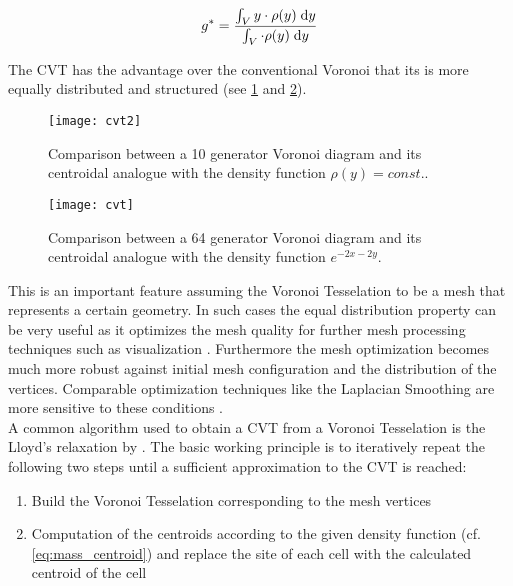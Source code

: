 \begin{equation} 
\label{eq:mass_centroid}
g^* = {{\int_V y \cdot \rho (y) \; \mathrm{d} y} \over {\int_V \cdot \rho (y) \; \mathrm{d} y}}
\end{equation}

The \ac{CVT} has the advantage over the conventional Voronoi that its is more equally distributed and structured (see \cref{fig:cvt2} and \cref{fig:cvt}).

\begin{figure}[H]
	\centering
	\texttt{[image: cvt2]}
	\caption{Comparison between a 10 generator Voronoi diagram and its centroidal analogue with the density function $ \rho(y) = const. $. \label{fig:cvt2}}
\end{figure}

\begin{figure}[H]
	\centering
	\texttt{[image: cvt]}
	\caption{Comparison between a 64 generator Voronoi diagram and its centroidal analogue with the density function $ e^{-2x-2y} $. \label{fig:cvt}}
\end{figure}

 This is an important feature assuming the Voronoi Tesselation to be a mesh that represents a certain geometry. In such cases the equal distribution property can be very useful as it optimizes the mesh quality for further mesh processing techniques such as visualization \cite{All05}. Furthermore the mesh optimization becomes much more robust against initial mesh configuration and the distribution of the vertices. Comparable optimization techniques like the Laplacian Smoothing are more sensitive to these conditions \cite{Wan05}.\\
 
A common algorithm used to obtain a \ac{CVT} from a Voronoi Tesselation is the Lloyd's relaxation by \cite{Llo82}.
The basic working principle is to iteratively repeat the following two steps until a sufficient approximation to the \ac{CVT} is reached:

\begin{enumerate}
\item Build the Voronoi Tesselation corresponding to the mesh vertices
\item Computation of the centroids according to the given density function (cf. \cref{eq:mass_centroid}) and replace the site of each cell with the calculated centroid of the cell
\end{enumerate}   